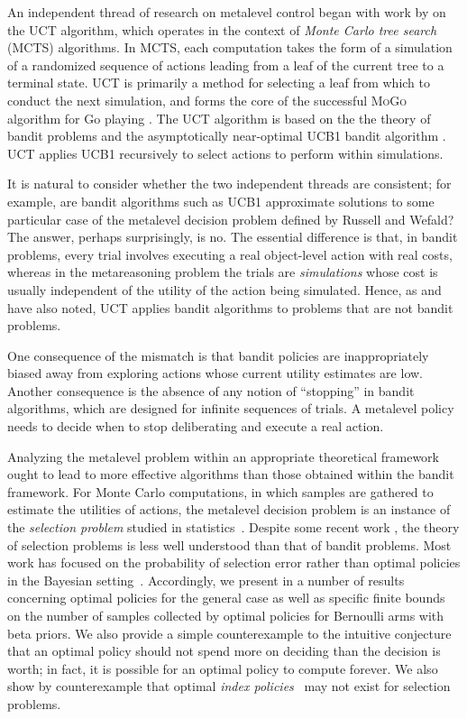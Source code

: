 An independent thread of research on metalevel control began with work
by \citet{Kocsis+Szepesvari:2006} on the UCT algorithm, which operates
in the context of {\em Monte Carlo tree search} (MCTS) algorithms.
In MCTS, each computation takes the form
of a simulation of a randomized sequence of actions leading from a leaf of the
current tree to a terminal state. UCT is primarily a method for
selecting a leaf from which to conduct the next simulation, and
forms the core of the successful \textsc{MoGo} algorithm for Go 
playing \citep{Gelly+Silver:2011}.  The UCT algorithm is
based on the the theory of bandit problems \citep{Berry+Fristedt:1985} and the asymptotically near-optimal
UCB1 bandit algorithm \citep{Auer+et+al:2002}. UCT applies
UCB1 recursively to select actions to perform within simulations.

It is natural to consider whether the two independent threads are
consistent; for example, are bandit algorithms such as UCB1
approximate solutions to some particular case of the metalevel
decision problem defined by Russell and Wefald? The answer, perhaps
surprisingly, is no.  The essential difference is that, in bandit
problems, every trial involves executing a real object-level action
with real costs, whereas in the metareasoning problem the trials are
{\em simulations} whose cost is usually independent of the utility of
the action being simulated.  Hence, as \citet{Audibert+al:2010}
and \citet{Bubeck+al:2011} have also noted, UCT applies bandit
algorithms to problems that are not bandit problems.

One consequence of the mismatch is that bandit policies are
inappropriately biased away from exploring actions whose current
utility estimates are low.  Another consequence is the absence of any
notion of ``stopping'' in bandit algorithms, which are designed for
infinite sequences of trials.  A metalevel policy needs to decide
when to stop deliberating and execute a real action.

Analyzing the metalevel problem within an appropriate theoretical
framework ought to lead to more effective algorithms than those
obtained within the bandit framework.  For Monte Carlo computations,
in which samples are gathered to estimate the utilities of actions,
the metalevel decision problem is an instance of the {\em selection
problem} studied in statistics~\citep{Bechhofer:1954,Swisher+et+al:2003}.  Despite
some recent work \citep{Frazier+Powell:2010,TolpinShimony:2012}, the theory of selection
problems is less well understood than that of bandit problems.
Most work has focused on the probability of selection error rather than
optimal policies in the Bayesian setting~\citep{Bubeck+al:2011}.
Accordingly, we present in 
a number of results concerning optimal policies for the general case
as well as specific finite
bounds on the number of samples collected by optimal policies for
Bernoulli arms with beta priors.  We also provide a simple
counterexample to the intuitive conjecture that an optimal policy
should not spend more on deciding than the decision is worth; in fact,
it is possible for an optimal policy to compute forever. We also show
by counterexample that optimal {\em index
policies}~\citep{Gittins:1989} may not exist for selection
problems.

